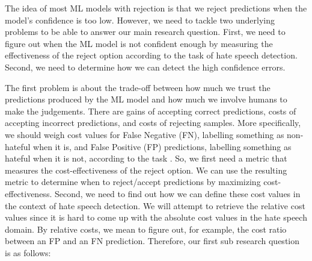 

The idea of most ML models with rejection is that we reject predictions when the model's confidence is too low. However, we need to tackle two underlying problems to be able to answer our main research question. First, we need to figure out when the ML model is not confident enough by measuring the effectiveness of the reject option according to the task of hate speech detection. Second, we need to determine how we can detect the high confidence errors.

The first problem is about the trade-off between how much we trust the predictions produced by the ML model and how much we involve humans to make the judgements. There are gains of accepting correct predictions, costs of accepting incorrect predictions, and costs of rejecting samples. More specifically, we should weigh cost values for False Negative (FN), labelling something as non-hateful when it is, and False Positive (FP) predictions, labelling something as hateful when it is not, according to the task \cite{sayin2021science}. So, we first need a metric that measures the cost-effectiveness of the reject option. We can use the resulting metric to determine when to reject/accept predictions by maximizing cost-effectiveness. Second, we need to find out how we can define these cost values in the context of hate speech detection. We will attempt to retrieve the relative cost values since it is hard to come up with the absolute cost values in the hate speech domain. By relative costs, we mean to figure out, for example, the cost ratio between an FP and an FN prediction. Therefore, our first sub research question is as follows:

